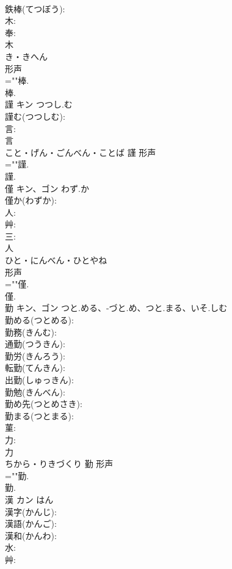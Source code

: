 \documentclass[8pt]{extreport}
\begin{document}
\begin{CJK}{UTF8}{min}
\\	鉄棒(てつぼう): 
\\	木: 
\\	奉: 
\\	木	
\\	き・きへん	
\\	形声 
\\	=""棒.
\\	棒.
\\	謹	キン	つつし.む		
\\	謹む(つつしむ): 
\\	言: 
\\	言	
\\	こと・げん・ごんべん・ことば	謹	形声 
\\	=""謹.
\\	謹.
\\	僅	キン、ゴン	わず.か		
\\	僅か(わずか): 
\\	人: 
\\	艸: 
\\	三: 
\\	人	
\\	ひと・にんべん・ひとやね	
\\	形声 
\\	=""僅.
\\	僅.
\\	勤	キン、ゴン	つと.める、-づと.め、つと.まる、いそ.しむ		
\\	勤める(つとめる): 
\\	勤務(きんむ): 
\\	通勤(つうきん): 
\\	勤労(きんろう): 
\\	転勤(てんきん): 
\\	出勤(しゅっきん): 
\\	勤勉(きんべん): 
\\	勤め先(つとめさき): 
\\	勤まる(つとまる): 
\\	菫: 
\\	力: 
\\	力	
\\	ちから・りきづくり	勤	形声 
\\	=""勤.
\\	勤.
\\	漢	カン		はん	
\\	漢字(かんじ): 
\\	漢語(かんご): 
\\	漢和(かんわ): 
\\	水: 
\\	艸: 

\end{CJK}
\end{document}
